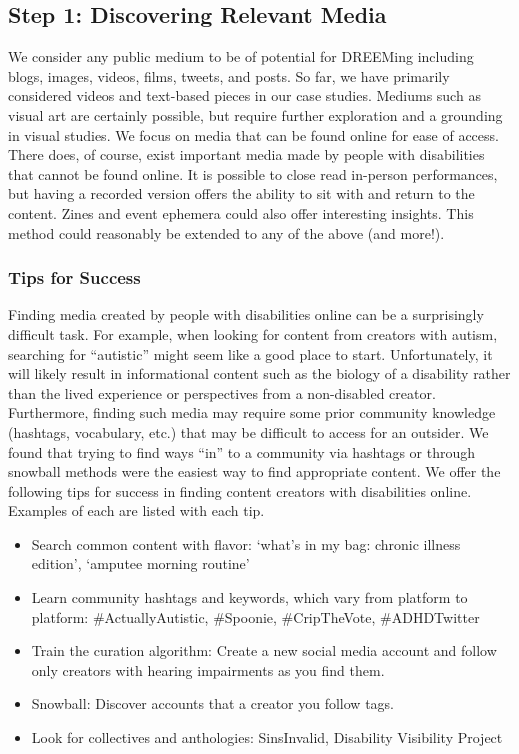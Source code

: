 \subsection{Step 1: Discovering Relevant Media}
We consider any public medium to be of potential for DREEMing including blogs, images, videos, films, tweets, and posts. So far, we have primarily considered videos and text-based pieces in our case studies. Mediums such as visual art are certainly possible, but require further exploration and a grounding in visual studies.  We focus on media that can be found online for ease of access. There does, of course, exist important media made by people with disabilities that cannot be found online. It is possible to close read in-person performances, but having a recorded version offers the ability to sit with and return to the content. Zines and event ephemera could also offer interesting insights. This method could reasonably be extended to any of the above (and more!).

\subsubsection{Tips for Success}
Finding media created by people with disabilities online can be a surprisingly difficult task. For example, when looking for content from creators with autism, searching for ``autistic'' might seem like a good place to start. Unfortunately, it will likely result in informational content such as the biology of a disability rather than the lived experience or perspectives from a non-disabled creator. Furthermore, finding such media may require some prior community knowledge (hashtags, vocabulary, etc.) that may be difficult to access for an outsider. We found that trying to find ways ``in'' to a community via hashtags or through snowball methods were the easiest way to find appropriate content. We offer the following tips for success in finding content creators with disabilities online. Examples of each are listed with each tip. 
 
\begin{itemize}
  \item Search common content with flavor: `what's in my bag: chronic illness edition', `amputee morning routine'
  \item Learn community hashtags and keywords, which vary from platform to platform: \#ActuallyAutistic, \#Spoonie, \#CripTheVote, \#ADHDTwitter
  \item Train the curation algorithm: Create a new social media account and follow only creators with hearing impairments as you find them. 
  \item Snowball: Discover accounts that a creator you follow tags. 
  \item Look for collectives and anthologies: SinsInvalid, Disability Visibility Project
\end{itemize}


